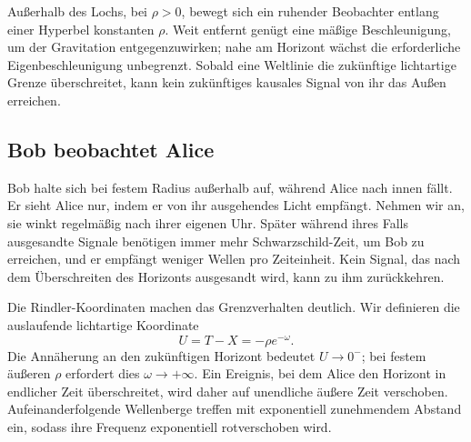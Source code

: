 Außerhalb des Lochs, bei \(\rho>0\), bewegt sich ein ruhender Beobachter entlang einer Hyperbel konstanten \(\rho\). Weit entfernt genügt eine mäßige Beschleunigung, um der Gravitation entgegenzuwirken; nahe am Horizont wächst die erforderliche Eigenbeschleunigung unbegrenzt. Sobald eine Weltlinie die zukünftige lichtartige Grenze überschreitet, kann kein zukünftiges kausales Signal von ihr das Außen erreichen.

\begin{classroomqa}
\end{classroomqa}

\begin{classroomqa}
\end{classroomqa}

\subsection{Bob beobachtet Alice}

Bob halte sich bei festem Radius außerhalb auf, während Alice nach innen fällt. Er sieht Alice nur, indem er von ihr ausgehendes Licht empfängt. Nehmen wir an, sie winkt regelmäßig nach ihrer eigenen Uhr. Später während ihres Falls ausgesandte Signale benötigen immer mehr Schwarzschild-Zeit, um Bob zu erreichen, und er empfängt weniger Wellen pro Zeiteinheit. Kein Signal, das nach dem Überschreiten des Horizonts ausgesandt wird, kann zu ihm zurückkehren.

Die Rindler-Koordinaten machen das Grenzverhalten deutlich. Wir definieren die auslaufende lichtartige Koordinate
\begin{equation}
U=T-X=-\rho e^{-\omega}.
\end{equation}
Die Annäherung an den zukünftigen Horizont bedeutet \(U\to0^{-}\); bei festem äußeren \(\rho\) erfordert dies \(\omega\to+\infty\). Ein Ereignis, bei dem Alice den Horizont in endlicher Zeit überschreitet, wird daher auf unendliche äußere Zeit verschoben. Aufeinanderfolgende Wellenberge treffen mit exponentiell zunehmendem Abstand ein, sodass ihre Frequenz exponentiell rotverschoben wird.

